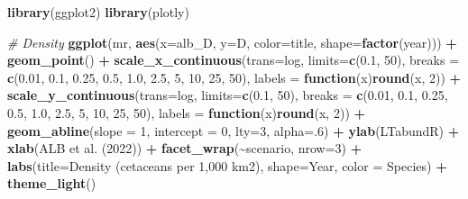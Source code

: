 \documentclass[
]{book}
\newenvironment{Shaded}{\begin{snugshade}}{\end{snugshade}}
\newcommand{\AttributeTok}[1]{\textcolor[rgb]{0.13,0.29,0.53}{#1}}
\newcommand{\CommentTok}[1]{\textcolor[rgb]{0.56,0.35,0.01}{\textit{#1}}}
\newcommand{\ControlFlowTok}[1]{\textcolor[rgb]{0.13,0.29,0.53}{\textbf{#1}}}
\newcommand{\DecValTok}[1]{\textcolor[rgb]{0.00,0.00,0.81}{#1}}
\newcommand{\FloatTok}[1]{\textcolor[rgb]{0.00,0.00,0.81}{#1}}
\newcommand{\FunctionTok}[1]{\textcolor[rgb]{0.13,0.29,0.53}{\textbf{#1}}}
\newcommand{\NormalTok}[1]{#1}
\newcommand{\SpecialCharTok}[1]{\textcolor[rgb]{0.81,0.36,0.00}{\textbf{#1}}}
\newcommand{\StringTok}[1]{\textcolor[rgb]{0.31,0.60,0.02}{#1}}
\begin{document}
\begin{Shaded}
\begin{Highlighting}[]
\FunctionTok{library}\NormalTok{(ggplot2)}
\FunctionTok{library}\NormalTok{(plotly)}

\CommentTok{\# Density}
\FunctionTok{ggplot}\NormalTok{(mr,}
       \FunctionTok{aes}\NormalTok{(}\AttributeTok{x=}\NormalTok{alb\_D, }\AttributeTok{y=}\NormalTok{D, }\AttributeTok{color=}\NormalTok{title, }\AttributeTok{shape=}\FunctionTok{factor}\NormalTok{(year))) }\SpecialCharTok{+}
    \FunctionTok{geom\_point}\NormalTok{() }\SpecialCharTok{+}
    \FunctionTok{scale\_x\_continuous}\NormalTok{(}\AttributeTok{trans=}\StringTok{\textquotesingle{}log\textquotesingle{}}\NormalTok{, }\AttributeTok{limits=}\FunctionTok{c}\NormalTok{(}\FloatTok{0.1}\NormalTok{, }\DecValTok{50}\NormalTok{), }
                       \AttributeTok{breaks =} \FunctionTok{c}\NormalTok{(}\FloatTok{0.01}\NormalTok{, }\FloatTok{0.1}\NormalTok{, }\FloatTok{0.25}\NormalTok{, }\FloatTok{0.5}\NormalTok{, }\FloatTok{1.0}\NormalTok{, }\FloatTok{2.5}\NormalTok{, }\DecValTok{5}\NormalTok{, }\DecValTok{10}\NormalTok{, }\DecValTok{25}\NormalTok{, }\DecValTok{50}\NormalTok{),}
                       \AttributeTok{labels =} \ControlFlowTok{function}\NormalTok{(x)}\FunctionTok{round}\NormalTok{(x, }\DecValTok{2}\NormalTok{)) }\SpecialCharTok{+}
    \FunctionTok{scale\_y\_continuous}\NormalTok{(}\AttributeTok{trans=}\StringTok{\textquotesingle{}log\textquotesingle{}}\NormalTok{, }\AttributeTok{limits=}\FunctionTok{c}\NormalTok{(}\FloatTok{0.1}\NormalTok{, }\DecValTok{50}\NormalTok{), }
                       \AttributeTok{breaks =} \FunctionTok{c}\NormalTok{(}\FloatTok{0.01}\NormalTok{, }\FloatTok{0.1}\NormalTok{, }\FloatTok{0.25}\NormalTok{, }\FloatTok{0.5}\NormalTok{, }\FloatTok{1.0}\NormalTok{, }\FloatTok{2.5}\NormalTok{, }\DecValTok{5}\NormalTok{, }\DecValTok{10}\NormalTok{, }\DecValTok{25}\NormalTok{, }\DecValTok{50}\NormalTok{),}
                       \AttributeTok{labels =} \ControlFlowTok{function}\NormalTok{(x)}\FunctionTok{round}\NormalTok{(x, }\DecValTok{2}\NormalTok{)) }\SpecialCharTok{+}
    \FunctionTok{geom\_abline}\NormalTok{(}\AttributeTok{slope =} \DecValTok{1}\NormalTok{, }\AttributeTok{intercept =} \DecValTok{0}\NormalTok{, }\AttributeTok{lty=}\DecValTok{3}\NormalTok{, }\AttributeTok{alpha=}\NormalTok{.}\DecValTok{6}\NormalTok{) }\SpecialCharTok{+}
    \FunctionTok{ylab}\NormalTok{(}\StringTok{\textquotesingle{}LTabundR\textquotesingle{}}\NormalTok{) }\SpecialCharTok{+} \FunctionTok{xlab}\NormalTok{(}\StringTok{\textquotesingle{}ALB et al. (2022)\textquotesingle{}}\NormalTok{) }\SpecialCharTok{+}
  \FunctionTok{facet\_wrap}\NormalTok{(}\SpecialCharTok{\textasciitilde{}}\NormalTok{scenario, }\AttributeTok{nrow=}\DecValTok{3}\NormalTok{) }\SpecialCharTok{+} 
  \FunctionTok{labs}\NormalTok{(}\AttributeTok{title=}\StringTok{\textquotesingle{}Density (cetaceans per 1,000 km2)\textquotesingle{}}\NormalTok{, }
       \AttributeTok{shape=}\StringTok{\textquotesingle{}Year\textquotesingle{}}\NormalTok{, }\AttributeTok{color =} \StringTok{\textquotesingle{}Species\textquotesingle{}}\NormalTok{) }\SpecialCharTok{+} 
  \FunctionTok{theme\_light}\NormalTok{()}
\end{Highlighting}
\end{Shaded}
\end{document}

